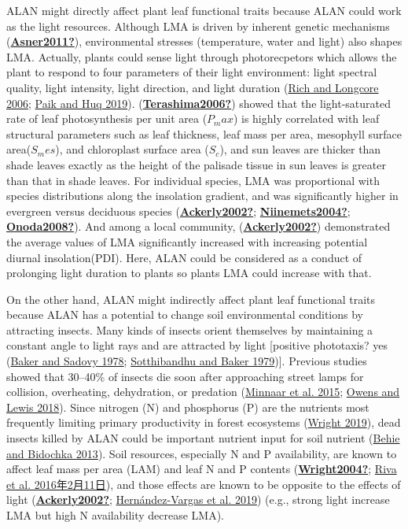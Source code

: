 \documentclass[
]{article}
\begin{document}
ALAN might directly affect plant leaf functional traits because ALAN
could work as the light resources. Although LMA is driven by inherent
genetic mechanisms
(\protect\hyperlink{ref-Asner2011}{\textbf{Asner2011?}}), environmental
stresses (temperature, water and light) also shapes LMA. Actually,
plants could sense light through photorecpetors which allows the plant
to respond to four parameters of their light environment: light spectral
quality, light intensity, light direction, and light duration
(\protect\hyperlink{ref-Rich2006}{Rich and Longcore 2006};
\protect\hyperlink{ref-Paik2019}{Paik and Huq 2019}).
(\protect\hyperlink{ref-Terashima2006}{\textbf{Terashima2006?}}) showed
that the light-saturated rate of leaf photosynthesis per unit area
(\(P_max\)) is highly correlated with leaf structural parameters such as
leaf thickness, leaf mass per area, mesophyll surface area(\(S_mes\)),
and chloroplast surface area (\(S_c\)), and sun leaves are thicker than
shade leaves exactly as the height of the palisade tissue in sun leaves
is greater than that in shade leaves. For individual species, LMA was
proportional with species distributions along the insolation gradient,
and was significantly higher in evergreen versus deciduous species
(\protect\hyperlink{ref-Ackerly2002}{\textbf{Ackerly2002?}};
\protect\hyperlink{ref-Niinemets2004}{\textbf{Niinemets2004?}};
\protect\hyperlink{ref-Onoda2008}{\textbf{Onoda2008?}}). And among a
local community,
(\protect\hyperlink{ref-Ackerly2002}{\textbf{Ackerly2002?}})
demonstrated the average values of LMA significantly increased with
increasing potential diurnal insolation(PDI). Here, ALAN could be
considered as a conduct of prolonging light duration to plants so plants
LMA could increase with that.

On the other hand, ALAN might indirectly affect plant leaf functional
traits because ALAN has a potential to change soil environmental
conditions by attracting insects. Many kinds of insects orient
themselves by maintaining a constant angle to light rays and are
attracted by light {[}positive phototaxis? yes
(\protect\hyperlink{ref-Baker1978}{Baker and Sadovy 1978};
\protect\hyperlink{ref-Sotthibandhu1979}{Sotthibandhu and Baker
1979}){]}. Previous studies showed that 30--40\% of insects die soon
after approaching street lamps for collision, overheating, dehydration,
or predation (\protect\hyperlink{ref-Minnaar2015}{Minnaar et al. 2015};
\protect\hyperlink{ref-Owens2018}{Owens and Lewis 2018}). Since nitrogen
(N) and phosphorus (P) are the nutrients most frequently limiting
primary productivity in forest ecosystems
(\protect\hyperlink{ref-Wright2019}{Wright 2019}), dead insects killed
by ALAN could be important nutrient input for soil nutrient
(\protect\hyperlink{ref-Behie2013}{Behie and Bidochka 2013}). Soil
resources, especially N and P availability, are known to affect leaf
mass per area (LAM) and leaf N and P contents
(\protect\hyperlink{ref-Wright2004}{\textbf{Wright2004?}};
\protect\hyperlink{ref-Riva2016}{Riva et al. 2016年2月11日}), and those
effects are known to be opposite to the effects of light
(\protect\hyperlink{ref-Ackerly2002}{\textbf{Ackerly2002?}};
\protect\hyperlink{ref-Hernandez-Vargas2019}{Hernández-Vargas et al.
2019}) (e.g., strong light increase LMA but high N availability decrease
LMA).
\end{document}
